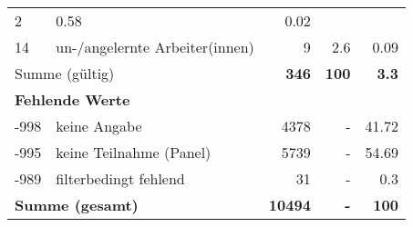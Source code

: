 \begin{longtable}{lXrrr}
       \num{2} &
       \num[round-mode=places,round-precision=2]{0.58} &
         \num[round-mode=places,round-precision=2]{0.02} \\

     14 &
     \multicolumn{1}{X}{ un-/angelernte Arbeiter(innen)   } &


       \num{9} &
       \num[round-mode=places,round-precision=2]{2.6} &
         \num[round-mode=places,round-precision=2]{0.09} \\
     \midrule
     \multicolumn{2}{l}{Summe (gültig)} &
       \textbf{\num{346}} &
     \textbf{\num{100}} &
       \textbf{\num[round-mode=places,round-precision=2]{3.3}} \\
     \multicolumn{5}{l}{\textbf{Fehlende Werte}}\\
       -998 &
       keine Angabe &
         \num{4378} &
        - &
         \num[round-mode=places,round-precision=2]{41.72} \\
       -995 &
       keine Teilnahme (Panel) &
         \num{5739} &
        - &
         \num[round-mode=places,round-precision=2]{54.69} \\
       -989 &
       filterbedingt fehlend &
         \num{31} &
        - &
         \num[round-mode=places,round-precision=2]{0.3} \\
     \midrule
     \multicolumn{2}{l}{\textbf{Summe (gesamt)}} &
          \textbf{\num{10494}} &
        \textbf{-} &
        \textbf{\num{100}} \\
     \bottomrule
     \end{longtable}
     
